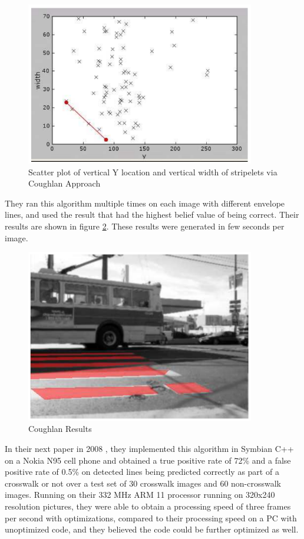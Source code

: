 \begin{figure}[t]
\begin{center}
\includegraphics[width=10cm]{figures/CoughlanScatter.png}
\captionfonts
\caption{Scatter plot of vertical Y location and vertical width of stripelets via Coughlan Approach \cite{Coughlan2006}}
\label{fig:CoughlanScatter}
\end{center}
\end{figure}

They ran this algorithm multiple times on each image with different envelope lines, and used the result that had the highest belief value of being correct. Their results are shown in figure \ref{fig:CoughlanResults}. These results were generated in few seconds per image. 

\begin{figure}[t]
\begin{center}
\includegraphics[width=10cm]{figures/CoughlanResult.png}
\captionfonts
\caption{Coughlan Results \cite{Coughlan2006}}
\label{fig:CoughlanResults}
\end{center}
\end{figure}

In their next paper in 2008 \cite{ZebraPhone}, they implemented this algorithm in Symbian C++ on a Nokia  N95 cell phone and obtained a true positive rate of 72\% and a false positive rate of 0.5\% on detected lines being predicted correctly as part of a crosswalk or not over a test set of 30 crosswalk images and 60 non-crosswalk images. Running on their 332 MHz ARM 11 processor running on 320x240 resolution pictures, they were able to obtain a processing speed of three frames per second with optimizations, compared to their processing speed on a PC with unoptimized code, and they believed the code could be further optimized as well. 